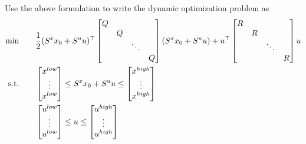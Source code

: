 \documentclass{article}
\begin{document}
Use the above formulation to write the dynamic optimization problem as
\begin{align*}
  \min \qquad& \frac{1}{2}(S^{x}x_0+S^{u}u)^{\top}\begin{bmatrix} Q \\  & Q \\  &  & \ddots \\  &  &  & Q \end{bmatrix}(S^{x}x_0 + S^{u}u) + u^{\top}\begin{bmatrix} R \\  & R \\  &  & \ddots \\  &  &  & R \end{bmatrix}u  \\ 
  \text{s.t.}\qquad& \begin{bmatrix} x^{low} \\ \vdots \\ x^{low} \end{bmatrix} \leq S^{x}x_0 + S^{u}u \leq \begin{bmatrix} x^{high} \\ \vdots \\ x^{high} \end{bmatrix} \\ 
  &\begin{bmatrix} u^{low} \\ \vdots \\ u^{low} \end{bmatrix} \leq u \leq \begin{bmatrix} u^{high} \\ \vdots  \\ u^{high} \end{bmatrix}
\end{align*}
\end{document}

